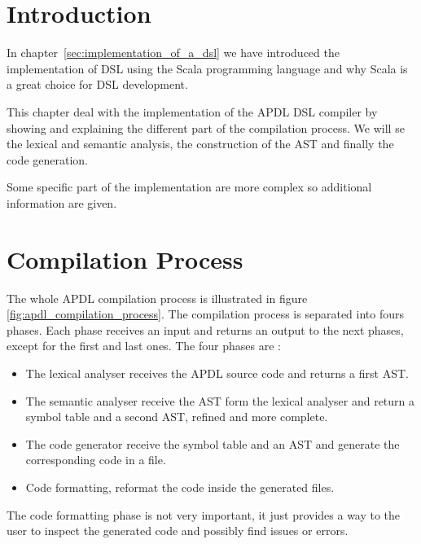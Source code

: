 
\section{Introduction}
\label{sec:implementation_intro}

In chapter~\ref{sec:implementation_of_a_dsl} we have introduced the
implementation of \gls{DSL} using the Scala programming language and why Scala
is a great choice for \gls{DSL} development.

This chapter deal with the implementation of the \gls{APDL} \gls{DSL} compiler
by showing and explaining the different part of the compilation process. We will
se the lexical and semantic analysis, the construction of the \gls{AST} and
finally the code generation.

Some specific part of the implementation are more complex so additional
information are given.

\section{Compilation Process}
\label{sec:compilation_process}

The whole \gls{APDL} compilation process is illustrated in figure
\ref{fig:apdl_compilation_process}. The compilation process is separated into
fours phases. Each phase receives an input and returns an output to the next
phases, except for the first and last ones. The four phases are :
\begin{itemize}
\item The lexical analyser receives the APDL source code and returns a first \gls{AST}.
\item The semantic analyser receive the \gls{AST} form the lexical analyser and
  return a symbol table and a second \gls{AST}, refined and more complete.
\item The code generator receive the symbol table and an \gls{AST} and generate
  the corresponding code in a file.
\item Code formatting, reformat the code inside the generated files.
\end{itemize}

The code formatting phase is not very important, it just provides a way to the
user to inspect the generated code and possibly find issues or errors.

